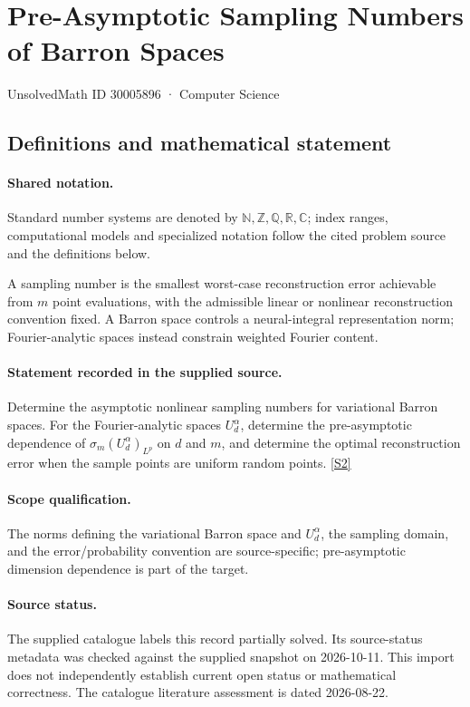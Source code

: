 \documentclass[11pt]{article}
\newcommand{\sref}[2]{\hyperlink{source:#1:#2}{[S#2]}}
\begin{document}
\setcounter{section}{30005895}
\section{Pre-Asymptotic Sampling Numbers of Barron Spaces}\label{30005896}
{\small\sffamily UnsolvedMath ID 30005896 · Computer Science}
\subsection{Definitions and mathematical statement}

\paragraph{Shared notation.}Standard number systems are denoted by $\mathbb N,\mathbb Z,\mathbb Q,\mathbb R,\mathbb C$; index ranges, computational models and specialized notation follow the cited problem source and the definitions below.


A sampling number is the smallest worst-case reconstruction error achievable from $m$ point evaluations, with the admissible linear or nonlinear reconstruction convention fixed. A Barron space controls a neural-integral representation norm; Fourier-analytic spaces instead constrain weighted Fourier content.
\paragraph{Statement recorded in the supplied source.}
Determine the asymptotic nonlinear sampling numbers for variational Barron spaces. For the Fourier-analytic spaces $U_d^\alpha$, determine the pre-asymptotic dependence of $\sigma_m(U_d^\alpha)_{L^p}$ on $d$ and $m$, and determine the optimal reconstruction error when the sample points are uniform random points. \sref{30005896}{2}
\paragraph{Scope qualification.}
The norms defining the variational Barron space and $U_d^\alpha$, the sampling domain, and the error/probability convention are source-specific; pre-asymptotic dimension dependence is part of the target.
\paragraph{Source status.}
The supplied catalogue labels this record partially solved. Its source-status metadata was checked against the supplied snapshot on 2026-10-11. This import does not independently establish current open status or mathematical correctness. The catalogue literature assessment is dated 2026-08-22.
\end{document}

